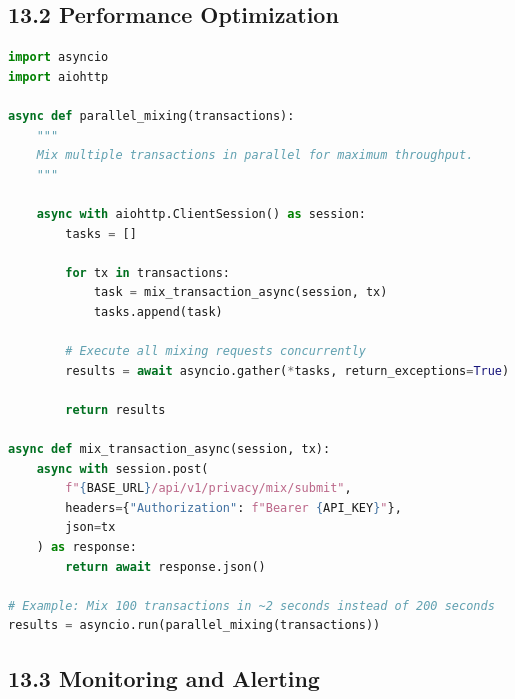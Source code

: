 \documentclass[11pt,a4paper]{article}
\begin{document}
\subsection{13.2 Performance Optimization}

\begin{lstlisting}[language=python]
import asyncio
import aiohttp

async def parallel_mixing(transactions):
    """
    Mix multiple transactions in parallel for maximum throughput.
    """

    async with aiohttp.ClientSession() as session:
        tasks = []

        for tx in transactions:
            task = mix_transaction_async(session, tx)
            tasks.append(task)

        # Execute all mixing requests concurrently
        results = await asyncio.gather(*tasks, return_exceptions=True)

        return results

async def mix_transaction_async(session, tx):
    async with session.post(
        f"{BASE_URL}/api/v1/privacy/mix/submit",
        headers={"Authorization": f"Bearer {API_KEY}"},
        json=tx
    ) as response:
        return await response.json()

# Example: Mix 100 transactions in ~2 seconds instead of 200 seconds
results = asyncio.run(parallel_mixing(transactions))
\end{lstlisting}

\subsection{13.3 Monitoring and Alerting}
\end{document}
